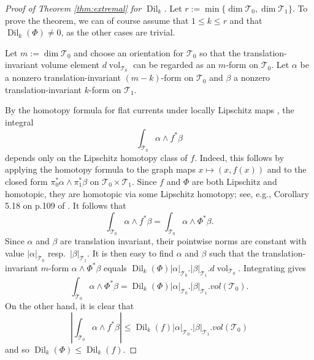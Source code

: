 \documentclass[11pt,letterpaper]{amsart}
\theoremstyle{definition}
\numberwithin{equation}{section}
\theoremstyle{definition}
\newcommand{\Tc}{\mathcal{T}}
\newcommand{\Dil}{\operatorname{Dil}}
\newcommand{\vol}{\operatorname{vol}}
\begin{document}
\begin{proof}[Proof of Theorem \ref{thm:extremal} for $\Dil_k$] 
Let $r:=\min\{\dim\Tc_0,\dim\Tc_1\}$.  To prove the theorem, we can of course assume that $1\leq k\leq r$ and that $\Dil_k(\Phi)\neq 0$, as the other cases are trivial.

Let $m:=\dim \Tc_0$ and choose an orientation for $\Tc_0$ so that the  translation-invariant volume element $d\!\vol_{\Tc_0}$ can 
be regarded as an $m$-form on $\Tc_0$. Let $\alpha$ be a nonzero translation-invariant $(m-k)$-form on $\Tc_0$ and $\beta$ a nonzero translation-invariant $k$-form on $\Tc_1$.    

By the homotopy formula for flat currents under locally Lipschitz maps
\cite[\S\S 4.1.9 and 4.1.14]{Fed69}, the integral
\[
\textstyle   \int_{\Tc_0}\alpha\wedge f^*\beta
\]
depends only on the Lipschitz homotopy class of  $f$. Indeed, this follows
by applying the homotopy formula to the graph maps
$x\mapsto (x,f(x))$ and to the closed form
$\pi_0^*\alpha\wedge\pi_1^*\beta$ on  $\Tc_0\times \Tc_1$.  Since $f$ and $\Phi$ are both Lipschitz and homotopic, they are homotopic via some Lipschitz homotopy; see, e.g., Corollary 5.18 on p.109 
of \cite{LV77}.  It follows that
\begin{equation}\label{eqn:calibration}
\textstyle \int_{\Tc_0} \alpha \wedge f^*\beta=\int_{\Tc_0} \alpha \wedge \Phi^*\beta.
\end{equation}
Since   $\alpha$ and $\beta$ are translation invariant, their pointwise norms are constant  with value $|\alpha|_{\Tc_0}$ resp.\  $|\beta|_{\Tc_1}$.  It is then easy to find  $\alpha$ and $\beta$ such that the translation-invariant $m$-form $\alpha \wedge \Phi^*\beta$ equals $\Dil_k(\Phi) |\alpha|_{\Tc_0} .|\beta|_{\Tc_1}.d\!\vol_{\Tc_0}$. Integrating gives
\[
\textstyle \int_{\Tc_0} \alpha \wedge \Phi^*\beta =\Dil_k(\Phi) |\alpha|_{\Tc_0} .|\beta|_{\Tc_1}. vol(\Tc_0).
\]
On the other hand, it is clear that 
\[
\textstyle |\int_{\Tc_0} \alpha \wedge f^*\beta|\le  \Dil_k(f) |\alpha |_{\Tc_0} . |\beta |_{\Tc_1}.vol(\Tc_0)
\] 
and so $\Dil_k(\Phi)\le \Dil_k(f)$.
\end{proof}
\end{document}
